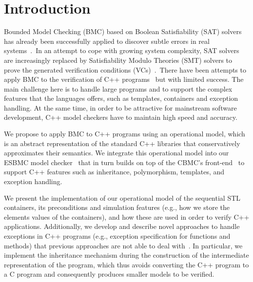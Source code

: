 \documentclass[a4paper]{llncs}
\newcommand{\comment}[1]{}
\begin{document}
\section{Introduction}
%
Bounded Model Checking (BMC) based on Boolean Satisfiability (SAT) solvers
has already been successfully applied to discover
subtle errors in real systems~\cite{handbook09}.\ In an attempt to cope
with growing system complexity, SAT solvers are increasingly
replaced by Satisfiability Modulo Theories (SMT) solvers to prove the generated
verification conditions (VCs)~\cite{Armando09,Ganai06,Cordeiro12}.\
There have been attempts to apply BMC to the verification of C++
programs~\cite{Florian12,Yang12} but with limited success. The main challenge
here is to handle large programs and to support the complex features that the
languages offers, such as templates, containers and exception handling.
At the same time, 
in order to be attractive for mainstream software development,
C++ model checkers have to maintain
high speed and accuracy.

\comment{
C++ is widely used, but systems that use C++
tend to require a high verification effort. C++
verification involves many more challenges than that of plain ANSI-C since the language provides
a wider set of features (e.g., object-oriented programming), libraries (e.g., specialized
input-output), and functionalities (e.g., templates). }


We propose to apply BMC to C++ programs using an operational model, which
is an abstract representation of the standard C++ libraries that
conservatively approximates their semantics. We integrate this operational model
into our ESBMC model checker~\cite{Cordeiro12} that in turn builds on top
of the CBMC's front-end~\cite{Clarke04} to support C++ features such
as inheritance, polymorphism, templates, and exception handling.

We present the implementation of our operational model of the sequential STL
containers, its preconditions and simulation features (e.g., how we store the
elements values of the containers), and how these are used in order to verify
C++ applications.  Additionally, we develop and describe novel approaches to handle
exceptions in C++ programs (e.g., exception specification for
functions and methods) that previous approaches are not able to deal
with~\cite{PrabhuMBIG11,Blanc07,Florian12}. In particular, we implement the
inheritance mechanism during the construction of the intermediate
representation of the program, which thus avoids converting the C++ program
to a C program and consequently produces smaller models to be verified.
%
\end{document}
